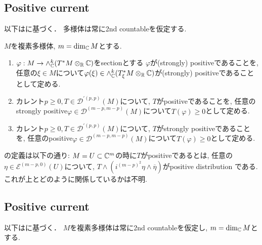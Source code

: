 \subsection{Positive current}
以下は\cite[Ch.3]{Dem}に基づく．
多様体は常に2nd countableを仮定する. 



\begin{tcolorbox}[mybox]
\begin{defn}
\label{defn-M-6.4.5}
$M$を複素多様体, $m=\dim_{\mathbb{C}} M$とする.
\begin{enumerate}
\item $\varphi : M \to \wedge_{\mathbb{C}}^{k}(T^{*}M \otimes_{\mathbb{R}} \mathbb{C})$をsectionとする
$\varphi$が(strongly) positiveであることを, 
任意の$\xi \in M$について$\varphi(\xi) \in\wedge_{\mathbb{C}}^{k}(T^{*}_{\xi}M \otimes_{\mathbb{R}} \mathbb{C})$が(strongly) positiveであることとして定める. 
\item カレント$p \ge 0, T \in \mathcal{D}^{'(p,p)}(M)$について, 
$T$がpositiveであることを, 任意のstrongly positive$\varphi \in  \mathcal{D}^{(m-p,m-p)}(M)$について$T(\varphi) \ge 0$として定める. 
\item カレント$p \ge 0, T \in \mathcal{D}^{'(p,p)}(M)$について, 
$T$がstrongly positiveであることを, 任意のpositive$\varphi \in  \mathcal{D}^{(m-p,m-p)}(M)$について$T(\varphi) \ge 0$として定める. 
\end{enumerate}
\end{defn}
\end{tcolorbox}

\begin{rem}
\cite{NO}の定義は以下の通り:
$M=U \subset \mathbb{C}^m$の時に$T$がpositiveであるとは, 任意の$\eta \in \mathcal{E}^{(m-p, 0)}(U)$について, 
$T \wedge (i^{(m-p)^2} \eta \wedge \overline{\eta})$がpositive distribution である. 
これが上とどのように関係しているかは不明. 
\end{rem}



\subsection{Positive current}
以下は\cite[Ch.3]{Dem}に基づく．
$M$を複素多様体は常に2nd countableを仮定し, $m=\dim_{\mathbb{C}} M$とする. 



